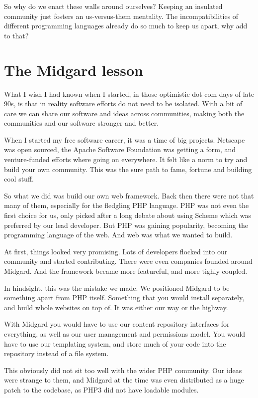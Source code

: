 So why do we enact these walls around ourselves? Keeping an insulated community
just fosters an us-versus-them mentality. The incompatibilities of different
programming languages already do so much to keep us apart, why add to that? 

\section*{The Midgard lesson}

What I wish I had known when I started, in those optimistic dot-com days of late
90s, is that in reality software efforts do not need to be isolated. With a bit
of care we can share our software and ideas across communities, making both the
communities and our software stronger and better.

When I started my free software career, it was a time of big projects. Netscape
was open sourced, the Apache Software Foundation was getting a form, and
venture-funded efforts where going on everywhere. It felt like a norm to try and
build your own community. This was the sure path to fame, fortune and building
cool stuff.

So what we did was build our own web framework. Back then there were not that
many of them, especially for the fledgling PHP language. PHP was not even the
first choice for us, only picked after a long debate about using Scheme which
was preferred by our lead developer. But PHP was gaining popularity, becoming
the programming language of the web. And web was what we wanted to build.

At first, things looked very promising. Lots of developers flocked into our
community and started contributing. There were even companies founded around
Midgard. And the framework became more featureful, and more tighly coupled.

In hindsight, this was the mistake we made. We positioned Midgard to be
something apart from PHP itself. Something that you would install separately,
and build whole websites on top of. It was either our way or the highway.

With Midgard you would have to use our content repository interfaces for
everything, as well as our user management and permissions model. You would have
to use our templating system, and store much of your code into the repository
instead of a file system.

This obviously did not sit too well with the wider PHP community. Our ideas were
strange to them, and Midgard at the time was even distributed as a huge patch to
the codebase, as PHP3 did not have loadable modules.

